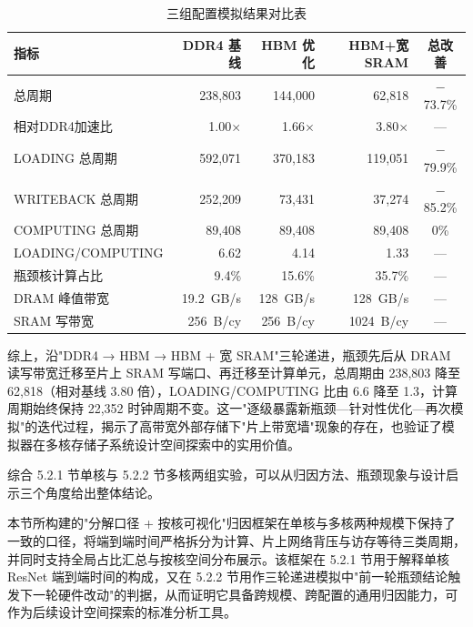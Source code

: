 \begin{table}[H]
  \centering
  \caption{三组配置模拟结果对比表}
  \label{tab:c5_comparison}
  \small
  \begin{tabular*}{\textwidth}{@{\extracolsep{\fill}}lrrrc}
    \toprule
    指标 & DDR4 基线 & HBM 优化 & HBM+宽SRAM & 总改善 \\
    \midrule
    总周期            & 238,803   & 144,000  & 62,818   & $-$73.7\% \\
    相对DDR4加速比    & 1.00$\times$ & 1.66$\times$ & 3.80$\times$ & --- \\
    LOADING 总周期    & 592,071   & 370,183  & 119,051  & $-$79.9\% \\
    WRITEBACK 总周期  & 252,209   & 73,431   & 37,274   & $-$85.2\% \\
    COMPUTING 总周期  & 89,408    & 89,408   & 89,408   & 0\% \\
    LOADING/COMPUTING & 6.62       & 4.14      & 1.33      & --- \\
    瓶颈核计算占比    & 9.4\%      & 15.6\%    & 35.7\%    & --- \\
    DRAM 峰值带宽     & \SI{19.2}{GB/s} & \SI{128}{GB/s} & \SI{128}{GB/s} & --- \\
    SRAM 写带宽       & \SI{256}{B/cy}  & \SI{256}{B/cy} & \SI{1024}{B/cy} & --- \\
    \bottomrule
  \end{tabular*}
\end{table}

综上，沿"DDR4 → HBM → HBM + 宽 SRAM"三轮递进，瓶颈先后从 DRAM 读写带宽迁移至片上 SRAM 写端口、再迁移至计算单元，总周期由 238,803 降至 62,818（相对基线 3.80 倍），LOADING/COMPUTING 比由 6.6 降至 1.3，计算周期始终保持 22,352 时钟周期不变。这一"逐级暴露新瓶颈—针对性优化—再次模拟"的迭代过程，揭示了高带宽外部存储下"片上带宽墙"现象的存在，也验证了模拟器在多核存储子系统设计空间探索中的实用价值。

\label{subsec:c5_bottleneck_overall}

综合 5.2.1 节单核与 5.2.2 节多核两组实验，可以从归因方法、瓶颈现象与设计启示三个角度给出整体结论。

本节所构建的"分解口径 + 按核可视化"归因框架在单核与多核两种规模下保持了一致的口径，将端到端时间严格拆分为计算、片上网络背压与访存等待三类周期，并同时支持全局占比汇总与按核空间分布展示。该框架在 5.2.1 节用于解释单核 ResNet 端到端时间的构成，又在 5.2.2 节用作三轮递进模拟中"前一轮瓶颈结论触发下一轮硬件改动"的判据，从而证明它具备跨规模、跨配置的通用归因能力，可作为后续设计空间探索的标准分析工具。

